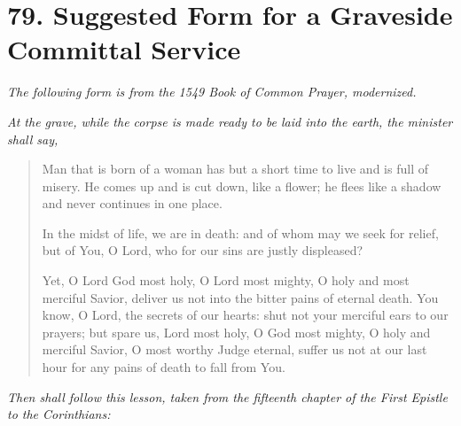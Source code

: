 \documentclass[
]{book}
\begin{document}
\hypertarget{suggested-form-for-a-graveside-committal-service}{%
\section*{79. Suggested Form for a Graveside Committal Service}\label{suggested-form-for-a-graveside-committal-service}}

\protect\hypertarget{chapter-slug-79-suggested-form-for-a-graveside-committal-service}{\href{}{}}

\protect\hypertarget{79}{\href{}{}}\emph{The following form is from the 1549 Book of Common Prayer, modernized.}

\begin{center}
\emph{At the grave, while the corpse is made ready to be laid into the earth, the minister shall say,}

\end{center}

\begin{quote}
Man that is born of a woman has but a short time to live and is full of misery. He comes up and is cut down, like a flower; he flees like a shadow and never continues in one place.

In the midst of life, we are in death: and of whom may we seek for relief, but of You, O Lord, who for our sins are justly displeased?

Yet, O Lord God most holy, O Lord most mighty, O holy and most merciful Savior, deliver us not into the bitter pains of eternal death. You know, O Lord, the secrets of our hearts: shut not your merciful ears to our prayers; but spare us, Lord most holy, O God most mighty, O holy and merciful Savior, O most worthy Judge eternal, suffer us not at our last hour for any pains of death to fall from You.
\end{quote}

\begin{center}
\emph{Then shall follow this lesson, taken from the fifteenth chapter of the First Epistle to the Corinthians:}

\end{center}
\end{document}
